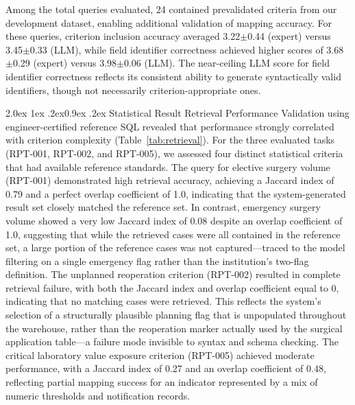 \documentclass[10pt,twocolumn]{article}
\makeatletter
\renewcommand\subsection{\@startsection{subsection}{2}{\z@}%
  {2.0ex \@plus 1ex \@minus .2ex}{0.9ex \@plus .2ex}%
  {\normalfont\normalsize\bfseries}}
\makeatother
\begin{document}
Among the total queries evaluated, 24 contained prevalidated criteria from our
development dataset, enabling additional validation of mapping accuracy. For
these queries, criterion inclusion accuracy averaged 3.22$\pm$0.44 (expert) versus 3.45$\pm$0.33 (LLM), while field identifier correctness achieved higher scores of 3.68$\pm$0.29 (expert) versus 3.98$\pm$0.06 (LLM).
The near-ceiling LLM score for field identifier correctness reflects its consistent
ability to generate syntactically valid identifiers, though not necessarily
criterion-appropriate ones.

\subsection{Statistical Result Retrieval Performance}
Validation using engineer-certified reference SQL revealed that performance
strongly correlated with criterion complexity (Table~\ref{tab:retrieval}). For
the three evaluated tasks (RPT-001, RPT-002, and RPT-005), we assessed four
distinct statistical criteria that had available reference standards. The query
for elective surgery volume (RPT-001) demonstrated high retrieval accuracy,
achieving a Jaccard index of 0.79 and a perfect overlap coefficient of 1.0,
indicating that the system-generated result set closely matched the reference
set. In contrast, emergency surgery volume showed a very low Jaccard index of 0.08 despite an overlap coefficient of 1.0, suggesting that while the retrieved
cases were all contained in the reference set, a large portion of the reference
cases was not captured---traced to the model filtering on a single emergency
flag rather than the institution's two-flag definition. The unplanned
reoperation criterion (RPT-002) resulted in complete retrieval failure, with
both the Jaccard index and overlap coefficient equal to 0, indicating that no
matching cases were retrieved. This reflects the system's selection of a
structurally plausible planning flag that is unpopulated throughout the
warehouse, rather than the reoperation marker actually used by the surgical
application table---a failure mode invisible to syntax and schema checking. The
critical laboratory value exposure criterion (RPT-005) achieved moderate
performance, with a Jaccard index of 0.27 and an overlap coefficient of 0.48,
reflecting partial mapping success for an indicator represented by a mix of
numeric thresholds and notification records.
\end{document}
